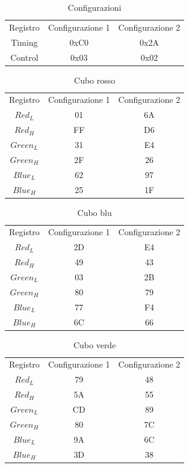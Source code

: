 \documentclass[12pt]{report}
\begin{document}
\label{sec:Timing}
    \begin{table}
        \centering
        \begin{tabular}{ccc}
            Registro & Configurazione 1 & Configurazione 2\\
             Timing& 0xC0 & 0x2A\\
             Control& 0x03 & 0x02\\
        \end{tabular}
        \caption{Configurazioni}
        \label{tab:configurazioni}
    \end{table}
    
    \begin{table}
        \centering
        \begin{tabular}{ccc}
            Registro & Configurazione 1 & Configurazione 2\\
             $Red_L$& 01 & 6A\\
             $Red_H$& FF & D6\\
             $Green_L$& 31 & E4\\
             $Green_H$& 2F & 26\\
             $Blue_L$& 62 & 97\\
             $Blue_H$& 25 & 1F\\
        \end{tabular}
        \caption{Cubo rosso}
        \label{tab:cubo_rosso}
    \end{table}
    
    \begin{table}
        \centering
        \begin{tabular}{ccc}
            Registro & Configurazione 1 & Configurazione 2\\
             $Red_L$& 2D & E4\\
             $Red_H$& 49 & 43\\
             $Green_L$& 03 & 2B\\
             $Green_H$& 80 & 79\\
             $Blue_L$& 77 & F4\\
             $Blue_H$& 6C & 66
        \end{tabular}
        \caption{Cubo blu}
        \label{tab:cubo_blu}
    \end{table}
        
    \begin{table}
        \centering
        \begin{tabular}{ccc}
            Registro & Configurazione 1 & Configurazione 2\\
             $Red_L$& 79 & 48\\
             $Red_H$& 5A & 55\\
             $Green_L$& CD & 89\\
             $Green_H$& 80 & 7C\\
             $Blue_L$& 9A & 6C\\
             $Blue_H$& 3D & 38
        \end{tabular}
        \caption{Cubo verde}
        \label{tab:cubo_verde}
    \end{table}
    
\end{document}
